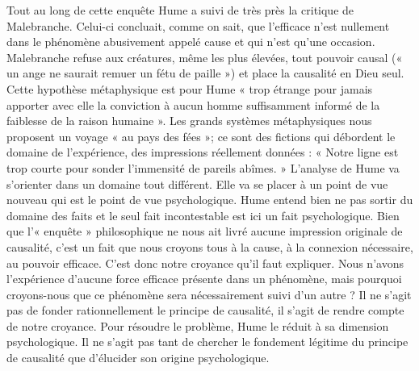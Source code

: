 Tout au long de cette enquête Hume a suivi de très
près la critique de Malebranche. Celui-ci concluait, comme
on sait, que l’efficace n’est nullement dans le phénomène
abusivement appelé cause et qui n’est qu’une occasion.
Malebranche refuse aux créatures, même les plus élevées,
tout pouvoir causal (« un ange ne saurait remuer un
fétu de paille ») et place la causalité en Dieu seul. Cette
hypothèse métaphysique est pour Hume « trop étrange
pour jamais apporter avec elle la conviction à aucun
homme suffisamment informé de la faiblesse de la raison
humaine ». Les grands systèmes métaphysiques nous
proposent un voyage « au pays des fées »; ce sont des
fictions qui débordent le domaine de l’expérience, des
impressions réellement données : « Notre ligne est trop
courte pour sonder l’immensité de pareils abîmes. »
L'analyse de Hume va s’orienter dans un domaine tout
différent. Elle va se placer à un point de vue nouveau qui
est le point de vue psychologique. Hume entend bien ne
pas sortir du domaine des faits et le seul fait incontestable
est ici un fait psychologique. Bien que l'« enquête » philosophique 
ne nous ait livré aucune impression originale
de causalité, c’est un fait que nous croyons tous à la cause,
à la connexion nécessaire, au pouvoir efficace. C’est donc
notre croyance qu’il faut expliquer. Nous n’avons l’expérience 
d’aucune force efficace présente dans un phénomène,
mais pourquoi croyons-nous que ce phénomène sera nécessairement 
suivi d’un autre ? Il ne s’agit pas de fonder
rationnellement le principe de causalité, il s’agit de rendre
compte de notre croyance. Pour résoudre le problème,
Hume le réduit à sa dimension psychologique. Il ne s’agit
pas tant de chercher le fondement légitime du principe
de causalité que d’élucider son origine psychologique.

